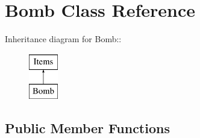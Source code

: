 \hypertarget{classBomb}{
\section{Bomb Class Reference}
\label{classBomb}
}
Inheritance diagram for Bomb::\begin{figure}[H]
\begin{center}
\leavevmode
\includegraphics[height=2cm]{classBomb}
\end{center}
\end{figure}
\subsection*{Public Member Functions}
